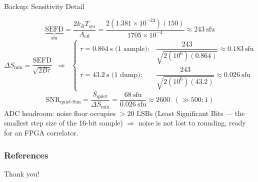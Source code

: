 \documentclass{beamer}
\newcounter{sframe}[section]
\renewcommand{\thesframe}{\thesection.\arabic{sframe}}
\newcommand{\ftitle}[1]{\stepcounter{sframe}{\normalsize\thesframe}\quad #1}
\begin{document}
\begin{frame}{\ftitle{Backup: Sensitivity Detail}}
\footnotesize
{}
\raggedright
\[
\underbrace{\text{SEFD}}_{\text{sfu}} = \frac{2k_BT_{\text{sys}}}{A_{\text{eff}}}
= \frac{2(1.381\times10^{-23})(150)}{1705\times10^{-4}}
\approx 243~\text{sfu}
\]
\[
\Delta S_{\min} = \frac{\text{SEFD}}{\sqrt{2B\tau}}
\;\;\Rightarrow\;\;
\begin{cases}
\tau=0.864~\text{s (1 sample)}: & \dfrac{243}{\sqrt{2(10^6)(0.864)}}\approx0.183~\text{sfu}\\[6pt]
\tau=43.2~\text{s (1 dump)}: & \dfrac{243}{\sqrt{2(10^6)(43.2)}}\approx0.026~\text{sfu}
\end{cases}
\]
\[
\text{SNR}_{\text{quiet-Sun}} = \frac{S_{\text{quiet}}}{\Delta S_{\min}}
= \frac{68~\text{sfu}}{0.026~\text{sfu}} \approx 2600 \;\;(\gg 500{:}1)
\]
\vspace{4pt}
\centering
ADC headroom: noise floor occupies $>20$ LSBs (Least Significant
Bits --- the smallest step size of the 16-bit sample) $\Rightarrow$
noise is not lost to rounding, ready for an FPGA correlator.
\end{frame}

\begin{frame}[allowframebreaks]
\frametitle{References}
\tiny{

}
\end{frame}

\begin{frame}
\Huge{\centerline{Thank you!}}
\end{frame}
\end{document}
